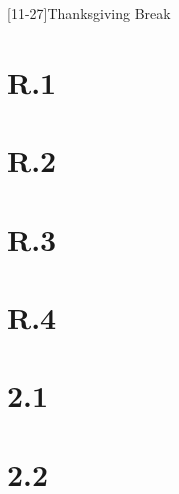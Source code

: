\documentclass{schedule}
\begin{document}
\maketitle
\begin{schedule}

	[11-27]{Thanksgiving Break}

	\quiz[date=8-26]

	\syllabus
	\section{R.1}
	\section{R.2}
	\section{R.3}
	\section[2]{R.4}
	\examreview
	\exam[noquiz]

	\section{2.1}
	\section[2]{2.2}
	\examreview
	\exam

	\finalreview
	\finalsweek[12-14][5]
	\winterbreak

\end{schedule}
\end{document}
